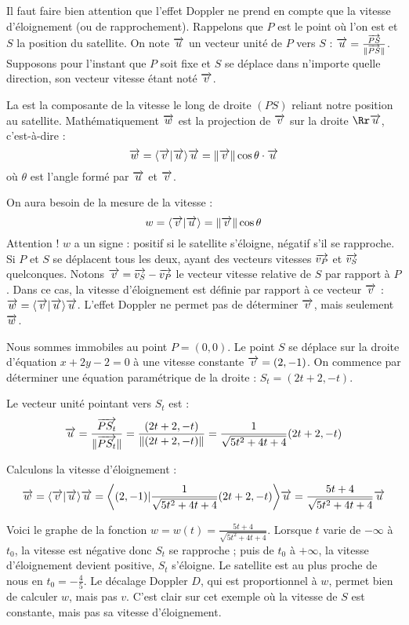 \documentclass[class=report,crop=false]{standalone}
\begin{document}
Il faut faire bien attention que l'effet Doppler ne prend en compte que la vitesse
d'éloignement (ou de rapprochement).
Rappelons que $P$ est le point où l'on est et $S$ la position du satellite.
 On note $\overrightarrow u$ un vecteur unité de $P$ vers $S$ : 
 $\overrightarrow u = \frac{\overrightarrow{PS}}{\|\overrightarrow{PS}\|}$.
Supposons pour l'instant que $P$ soit fixe 
et $S$ se déplace dans n'importe quelle direction, son vecteur vitesse 
étant noté $\overrightarrow v$.

\begin{definition}
La  est la composante de la vitesse 
le long de droite $(PS)$ reliant notre position au satellite.
Mathématiquement $\overrightarrow w$ est la projection de $\overrightarrow v$ sur la droite 
$\Rr \vect u$, c'est-à-dire :
$$\overrightarrow w = \langle \overrightarrow v | \overrightarrow u \rangle \overrightarrow u = \| \overrightarrow v \| \cos \theta \cdot \overrightarrow u$$
où $\theta$ est l'angle formé par $\overrightarrow u$ et $\overrightarrow v$.  
\end{definition}


On aura besoin de la mesure de la vitesse :
$$w = \langle \overrightarrow v | \overrightarrow u \rangle = \| \overrightarrow v \| \cos \theta $$
Attention ! $w$ a un signe : positif si le satellite s'éloigne, 
négatif s'il se rapproche.
Si $P$ et $S$ se déplacent tous les deux, ayant des vecteurs vitesses
$\overrightarrow{v_P}$ et $\overrightarrow{v_S}$ quelconques. Notons $\overrightarrow v = \overrightarrow{v_S}-\overrightarrow{v_P}$ le vecteur vitesse relative de $S$ 
par rapport à $P$. Dans ce cas, la vitesse d'éloignement est définie par rapport à ce vecteur $\overrightarrow v$ :
$\overrightarrow w = \langle \overrightarrow v | \overrightarrow u \rangle \overrightarrow u$.
L'effet Doppler ne permet pas de déterminer $\overrightarrow v$, mais seulement $\overrightarrow w$.

\begin{exemple}
Nous sommes immobiles au point $P = (0,0)$. Le point 
$S$ se déplace sur la droite 
d'équation $x+2y-2=0$ à une vitesse constante
$\overrightarrow v = (2,-1)$.
On commence par déterminer une équation paramétrique de la droite : 
$S_t = (2t+2,-t)$. 

Le vecteur unité pointant vers $S_t$ est :
$$\overrightarrow u = \frac{\overrightarrow{PS_t}}{\|\overrightarrow{PS_t}\|}
= \frac{(2t+2,-t)}{\| (2t+2,-t) \|} = \frac{1}{\sqrt{5t^2+4t+4}} (2t+2,-t)$$

Calculons la vitesse d'éloignement :
$$\overrightarrow w = \langle \overrightarrow v | \overrightarrow u \rangle \overrightarrow u
= \bigg\langle (2,-1) | \frac{1}{\sqrt{5t^2+4t+4}} (2t+2,-t) \bigg\rangle \overrightarrow u
= \frac{5t+4}{\sqrt{5t^2+4t+4}} \overrightarrow u$$

Voici le graphe de la fonction $w = w(t) = \frac{5t+4}{\sqrt{5t^2+4t+4}}$.
Lorsque $t$ varie de $-\infty$ à $t_0$, la vitesse est négative donc
$S_t$ se rapproche ; puis de $t_0$ à $+\infty$, la vitesse d'éloignement devient positive,
$S_t$ s'éloigne. Le satellite est au plus proche de nous en $t_0 = -\frac{4}{5}$.
Le décalage Doppler $D$, qui est proportionnel à $w$, permet bien de calculer
$w$, mais pas $v$. C'est clair sur cet exemple où la vitesse de $S$ est constante,
mais pas sa vitesse d'éloignement.
\end{exemple}
\end{document}

